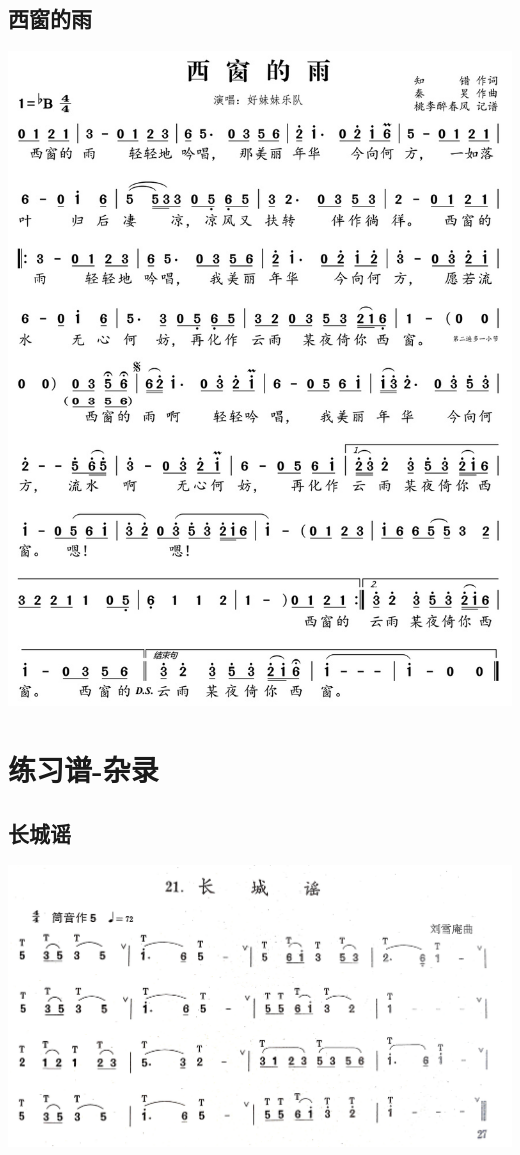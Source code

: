 \documentclass[cn,pad,chinesefont=nofont,twocol]{elegantbook}
\begin{document}
\section{西窗的雨}
    \includegraphics[width=\textwidth]{dongxiao/20200516-好妹妹-西窗的雨.jpg}
    
\chapter{练习谱-杂录}
\section{长城谣}
    \includegraphics[width=\textwidth]{dongxiao/20200711-长城谣.jpg}
\end{document}
